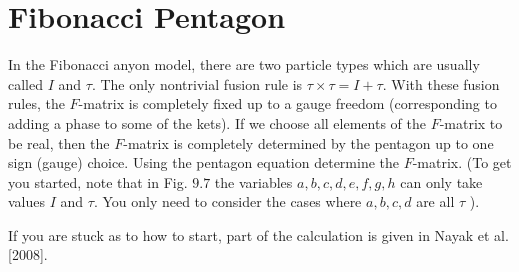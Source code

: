 \documentclass{book}
\begin{document}
\section{Fibonacci Pentagon}
In the Fibonacci anyon model, there are two particle types which are usually called $I$ and $\tau $. The only nontrivial fusion rule is $\tau \times \tau =I+\tau $. With these fusion rules, the $F$-matrix is completely fixed up to a gauge freedom (corresponding to adding a phase to some of the kets). If we choose all elements of the $F$-matrix to be real, then the $F$-matrix is completely determined by the pentagon up to one sign (gauge) choice. Using the pentagon equation determine the $F$-matrix. (To get you started, note that in Fig. $9.7$ the variables $a,b,c,d,e,f,g,h$ can only take values $I$ and $\tau $. You only need to consider the cases where $a,b,c,d$ are all $\tau $ ).

If you are stuck as to how to start, part of the calculation is given in Nayak et al. [2008].
\end{document}
